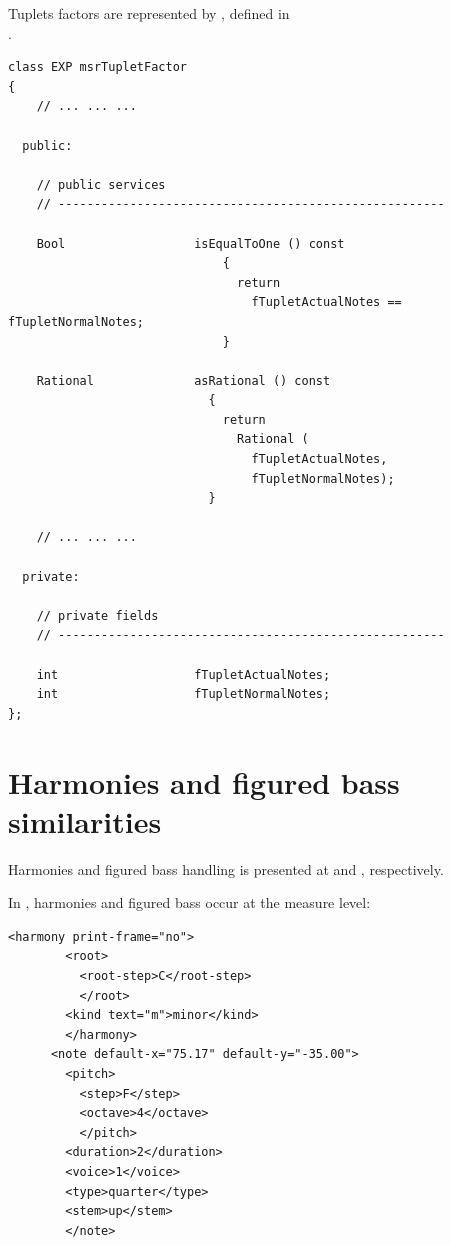 Tuplets factors are represented by , defined in\\
.
\begin{lstlisting}[language=CPlusPlus]
class EXP msrTupletFactor
{
	// ... ... ...

  public:

    // public services
    // ------------------------------------------------------

    Bool                  isEqualToOne () const
                              {
                                return
                                  fTupletActualNotes == fTupletNormalNotes;
                              }

    Rational              asRational () const
                            {
                              return
                                Rational (
                                  fTupletActualNotes,
                                  fTupletNormalNotes);
                            }

	// ... ... ...

  private:

    // private fields
    // ------------------------------------------------------

    int                   fTupletActualNotes;
    int                   fTupletNormalNotes;
};
\end{lstlisting}


\section{Harmonies and figured bass similarities}\label{Harmonies and figured bass similarities}

Harmonies and figured bass handling is presented at  and , respectively.

In \mxml, harmonies and figured bass occur at the measure level:
\begin{lstlisting}[language=MusicXML]
      <harmony print-frame="no">
        <root>
          <root-step>C</root-step>
          </root>
        <kind text="m">minor</kind>
        </harmony>
      <note default-x="75.17" default-y="-35.00">
        <pitch>
          <step>F</step>
          <octave>4</octave>
          </pitch>
        <duration>2</duration>
        <voice>1</voice>
        <type>quarter</type>
        <stem>up</stem>
        </note>
\end{lstlisting}

